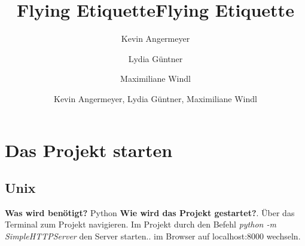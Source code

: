 \documentclass{mi-seminar}
\title{Flying Etiquette}
\author{Kevin Angermeyer \\ \and Lydia Güntner \\ \and Maximiliane Windl}
\title{Flying Etiquette}
\author{Kevin Angermeyer, Lydia Güntner, Maximiliane Windl}
\begin{document}
\maketitle

\section{Das Projekt starten} \label{Das Projekt starten}
\subsection{Unix}
\textbf{Was wird benötigt?}\newline
Python\newline\newline
\textbf{Wie wird das Projekt gestartet?}. Über das Terminal zum Projekt navigieren. Im Projekt durch den Befehl\newline 
\textit{python -m SimpleHTTPServer}\newline
den Server starten.. im Browser auf localhost:8000 wechseln.
\end{document}
